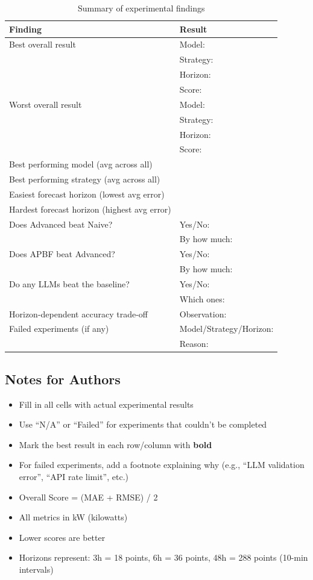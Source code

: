 \documentclass{article}
\begin{document}
\begin{table}[h!]
\centering
\caption{Summary of experimental findings}
\begin{tabular}{p{5cm}|p{10cm}}
\toprule
\textbf{Finding} & \textbf{Result} \\
\midrule
Best overall result & Model: \\
 & Strategy: \\
 & Horizon: \\
 & Score: \\
\midrule
Worst overall result & Model: \\
 & Strategy: \\
 & Horizon: \\
 & Score: \\
\midrule
Best performing model (avg across all) & \\
\midrule
Best performing strategy (avg across all) & \\
\midrule
Easiest forecast horizon (lowest avg error) & \\
\midrule
Hardest forecast horizon (highest avg error) & \\
\midrule
Does Advanced beat Naive? & Yes/No: \\
 & By how much: \\
\midrule
Does APBF beat Advanced? & Yes/No: \\
 & By how much: \\
\midrule
Do any LLMs beat the baseline? & Yes/No: \\
 & Which ones: \\
\midrule
Horizon-dependent accuracy trade-off & Observation: \\
\midrule
Failed experiments (if any) & Model/Strategy/Horizon: \\
 & Reason: \\
\bottomrule
\end{tabular}
\end{table}

\subsection*{Notes for Authors}

\begin{itemize}
\item Fill in all cells with actual experimental results
\item Use ``N/A'' or ``Failed'' for experiments that couldn't be completed
\item Mark the best result in each row/column with \textbf{bold}
\item For failed experiments, add a footnote explaining why (e.g., ``LLM validation error'', ``API rate limit'', etc.)
\item Overall Score = (MAE + RMSE) / 2
\item All metrics in kW (kilowatts)
\item Lower scores are better
\item Horizons represent: 3h = 18 points, 6h = 36 points, 48h = 288 points (10-min intervals)
\end{itemize}
\end{document}
